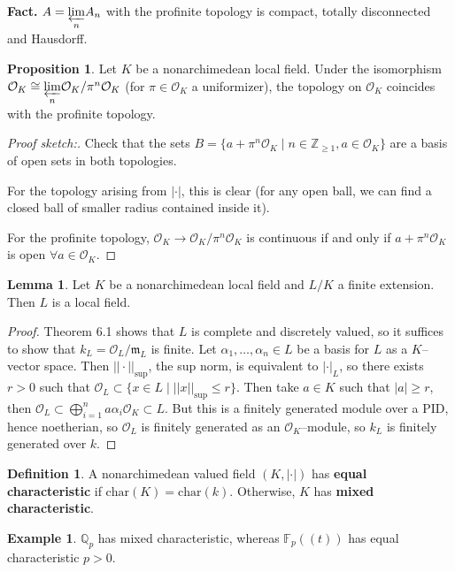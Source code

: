 \documentclass{article}
\theoremstyle{definition}
\newtheorem{lemma}[theorem]{Lemma}
\newtheorem{prop}[theorem]{Proposition}
\newtheorem{example}{Example}[section]
\newtheorem{defn}{Definition}[section]
\begin{document}
\textbf{Fact.} $A = \underset{n}{\varprojlim} A_n $ with the profinite topology is compact, totally disconnected and Hausdorff.
\begin{prop}
    Let $K$ be a nonarchimedean local field. Under the isomorphism $\mathcal{O}_K \cong \underset{n}{\varprojlim} \mathcal{O}_K/\pi^n \mathcal{O}_K$ (for $\pi \in \mathcal{O}_K$ a uniformizer), the topology on $\mathcal{O}_K$ coincides with the profinite topology.
\end{prop}
\begin{proof}[Proof sketch:]
    Check that the sets $B = \{a + \pi^n \mathcal{O}_K \mid n \in \mathbb{Z}_{\ge 1}, a \in \mathcal{O}_K\}$ are a basis of open sets in both topologies. 
    \vspace{1mm}
    
    For the topology arising from $|\cdot|$, this is clear (for any open ball, we can find a closed ball of smaller radius contained inside it). 
    \vspace{1mm}
    
    For the profinite topology, $\mathcal{O}_K \to \mathcal{O}_K/\pi^n \mathcal{O}_K$ is continuous if and only if $a + \pi^n \mathcal{O}_K$ is open $\forall a \in \mathcal{O}_K$.
\end{proof}
\begin{lemma}
    Let $K$ be a nonarchimedean local field and $L/K$ a finite extension. Then $L$ is a local field.
\end{lemma}
\begin{proof}
    Theorem 6.1 shows that $L$ is complete and discretely valued, so it suffices to show that $k_L = \mathcal{O}_L/\mathfrak{m}_L$ is finite. Let $\alpha_1,\ldots,\alpha_n \in L$ be a basis for $L$ as a $K$--vector space. Then $||\cdot||_{\text{sup}}$, the sup norm, is equivalent to $|\cdot|_L$, so there exists $r>0$ such that $\mathcal{O}_L \subset \{x \in L \mid ||x||_{\text{sup}} \le r\}$. Then take $a \in K$ such that $|a|\ge r$, then $\mathcal{O}_L \subset \bigoplus_{i=1}^n a \alpha_i \mathcal{O}_K \subset L$. But this is a finitely generated module over a PID, hence noetherian, so $\mathcal{O}_L$ is finitely generated as an $\mathcal{O}_K$--module, so $k_L$ is finitely generated over $k$.
\end{proof}
\begin{defn}
    A nonarchimedean valued field $(K, |\cdot|)$ has \textbf{equal characteristic} if $\text{char}(K) = \text{char}(k)$. Otherwise, $K$ has \textbf{mixed characteristic}.
\end{defn}
\begin{example}
    $\mathbb{Q}_p$ has mixed characteristic, whereas $\mathbb{F}_p((t))$ has equal characteristic $p>0$.
\end{example}
\end{document}

